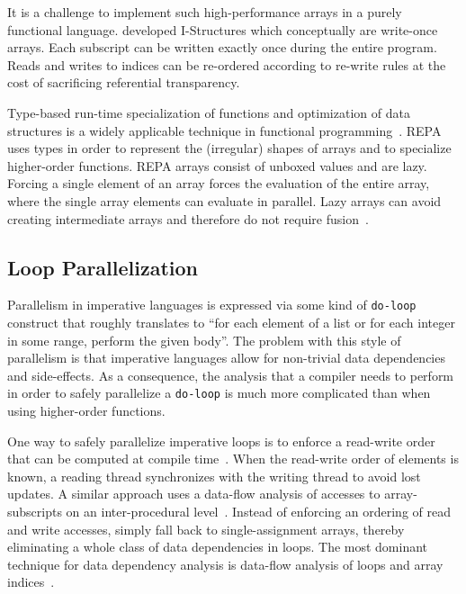 \documentclass[a4paper]{article}
\begin{document}
It is a challenge to implement such high-performance arrays in a purely functional language. \citet{Arvind:1989:IDS:69558.69562} developed I-Structures which conceptually are write-once arrays. Each subscript can be written exactly once during the entire program. Reads and writes to indices can be re-ordered according to re-write rules at the cost of sacrificing referential transparency.

Type-based run-time specialization of functions and optimization of data structures is a widely applicable technique in functional programming~\cite{Hall:1994:UHT:182409.156781}. REPA~\cite{Keller:2010:RSP:1863543.1863582} uses types in order to represent the (irregular) shapes of arrays and to specialize higher-order functions. REPA arrays consist of unboxed values and are lazy. Forcing a single element of an array forces the evaluation of the entire array, where the single array elements can evaluate in parallel. Lazy arrays can avoid creating intermediate arrays and therefore do not require fusion~\cite{Keller:2010:RSP:1863543.1863582}.

\subsection{Loop Parallelization}
\label{sec:loop-parallelization}

Parallelism in imperative languages is expressed via some kind of \texttt{do-loop} construct that roughly translates to ``for each element of a list or for each integer in some range, perform the given body''. The problem with this style of parallelism is that imperative languages allow for non-trivial data dependencies and side-effects. As a consequence, the analysis that a compiler needs to perform in order to safely parallelize a \texttt{do-loop} is much more complicated than when using higher-order functions.

One way to safely parallelize imperative loops is to enforce a read-write order that can be computed at compile time~\cite{Tang:1990:CTD:77726.255155}. When the read-write order of elements is known, a reading thread synchronizes with the writing thread to avoid lost updates. A similar approach uses a data-flow analysis of accesses to array-subscripts on an inter-procedural level~\cite{Maydan:1993:AFA:158511.158515}. Instead of enforcing an ordering of read and write accesses, \citet{Knobe:1998:ASF:268946.268956} simply fall back to single-assignment arrays, thereby eliminating a whole class of data dependencies in loops. The most dominant technique for data dependency analysis is data-flow analysis of loops and array indices~\cite{Maydan:1993:AFA:158511.158515, Knobe:1998:ASF:268946.268956}.
\end{document}
